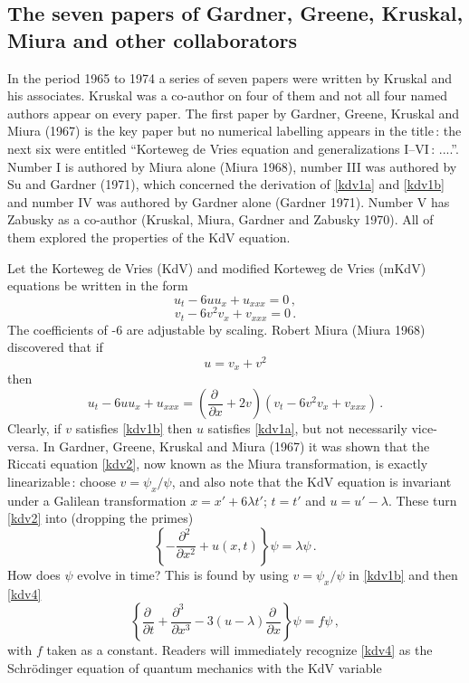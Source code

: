 \documentclass[11pt]{article}
\newcommand{\bel}{\begin{equation}\label}
\newcommand{\ee}{\end{equation}}
\begin{document}
\subsection{\small The seven papers of Gardner, Greene, Kruskal, Miura and other collaborators}

In the period 1965 to 1974 a series of seven papers were written by Kruskal and his associates. Kruskal was a co-author on four of them and not all four named authors appear on every paper. The first paper by Gardner, Greene, Kruskal and Miura (1967) is the key paper but no numerical labelling appears in the title\,: the next six were entitled ``Korteweg de Vries equation and generalizations I--VI\,: ....''. Number I is authored by Miura alone (Miura 1968), number III was authored by Su and Gardner (1971), which concerned the derivation of \eqref{kdv1a} and \eqref{kdv1b} and number IV was authored by Gardner alone (Gardner 1971). Number V has Zabusky as a co-author (Kruskal, Miura, Gardner and Zabusky 1970). All of them explored the properties of the KdV equation. 
\par\smallskip%
Let the Korteweg de Vries (KdV) and modified Korteweg de Vries (mKdV) equations be written in the form
\bel{kdv1a}
u_{t} - 6 uu_{x} + u_{xxx} = 0\,,
\ee
\bel{kdv1b}
v_{t} - 6 v^{2}v_{x} + v_{xxx} = 0\,.
\ee
The coefficients of -6 are adjustable by scaling. Robert Miura (Miura 1968) discovered that if 
\bel{kdv2}
u = v_{x} + v^{2} 
\ee
then 
\bel{kdv3}
u_{t} - 6 uu_{x} + u_{xxx} = \left(\frac{\partial~}{\partial x} + 2v\right)(v_{t} - 6 v^{2}v_{x} + v_{xxx})\,.
\ee
Clearly, if $v$ satisfies \eqref{kdv1b} then $u$ satisfies \eqref{kdv1a}, but not necessarily vice-versa. In Gardner, 
Greene, Kruskal and Miura (1967) it was shown that the Riccati equation \eqref{kdv2}, now known as the Miura transformation, 
is exactly linearizable\,: choose $v= \psi_{x}/\psi$, and also note that the KdV equation is invariant under a Galilean transformation $x = x' + 6\lambda t'$; $t = t'$ and $u = u' -\lambda$. These turn \eqref{kdv2} into (dropping the primes) 
\bel{kdv4}
\left\{- \frac{\partial^{2}~}{\partial x^2} + u(x,t)\right\}\psi = \lambda \psi\,.
\ee
How does $\psi$ evolve in time? This is found by using $v = \psi_{x}/\psi$ in \eqref{kdv1b} and then \eqref{kdv4}
\bel{kdv5}
\left\{\frac{\partial~}{\partial t} + \frac{\partial^{3}~~}{\partial x^{3}} - 3 (u - \lambda)\frac{\partial~}{\partial x} \right\} \psi = f \psi\,,
\ee
with $f$ taken as a constant. 
Readers will immediately recognize \eqref{kdv4} as the Schr\"odinger equation of quantum mechanics with the KdV variable 
\end{document}
